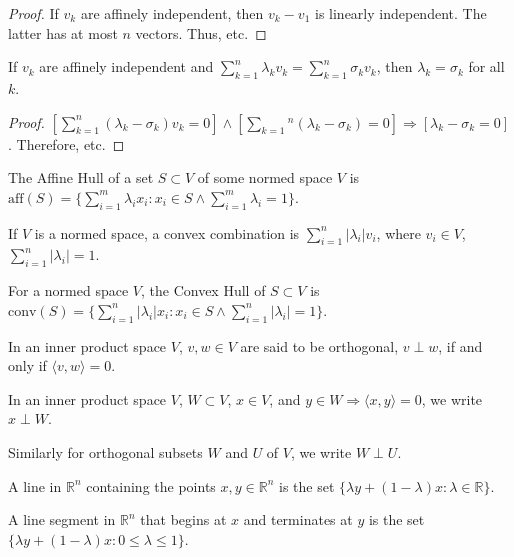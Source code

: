 \documentclass[crop=false,class=book]{standalone}
\begin{document}
\begin{proof}
If $v_k$ are affinely independent, then $v_k-v_1$ is linearly independent. The latter has at most $n$ vectors. Thus, etc.
\end{proof}
\begin{corollary}
If $v_k$ are affinely independent and $\sum_{k=1}^{n}\lambda_k v_k = \sum_{k=1}^{n} \sigma_k v_k$, then $\lambda_k = \sigma_k$ for all $k$.
\end{corollary}
\begin{proof}
$[\sum_{k=1}^{n}(\lambda_k - \sigma_k)v_k = 0]\land[\sum_{k=1}{^n}(\lambda_k-\sigma_k) = 0]\Rightarrow [\lambda_k-\sigma_k = 0]$. Therefore, etc.
\end{proof}
\begin{definition}
The Affine Hull of a set $S\subset V$ of some normed space $V$ is $\textrm{aff}(S) = \{\sum_{i=1}^{m}\lambda_i x_i: x_i \in S\land \sum_{i=1}^{m}\lambda_i =1\}$.
\end{definition}
\begin{definition}
If $V$ is a normed space, a convex combination is $\sum_{i=1}^{n}|\lambda_i| v_i$, where $v_i\in V$, $\sum_{i=1}^{n}|\lambda_i| = 1$.
\end{definition}
\begin{definition}
For a normed space $V$, the Convex Hull of $S\subset V$ is $\textrm{conv}(S)=\{\sum_{i=1}^{n}|\lambda_i| x_i:x_i\in S\land \sum_{i=1}^{n} |\lambda_i| = 1 \}$.
\end{definition}
\begin{definition}
In an inner product space $V$, $v,w\in V$ are said to be orthogonal, $v\perp w$, if and only if $\langle v,w \rangle = 0$.
\end{definition}
\begin{notation}
In an inner product space $V$, $W\subset V$, $x\in V$, and $y\in W \Rightarrow \langle x,y\rangle = 0$, we write $x\perp W$.
\end{notation}
\begin{notation}
Similarly for orthogonal subsets $W$ and $U$ of $V$, we write $W\perp U$.
\end{notation}
\begin{definition}
A line in $\mathbb{R}^n$ containing the points $x,y\in \mathbb{R}^n$ is the set $\{\lambda y + (1-\lambda)x: \lambda \in \mathbb{R}\}$.
\end{definition}
\begin{definition}
A line segment in $\mathbb{R}^n$ that begins at $x$ and terminates at $y$ is the set $\{\lambda y + (1-\lambda)x: 0\leq \lambda \leq 1 \}$.
\end{definition}
\end{document}
